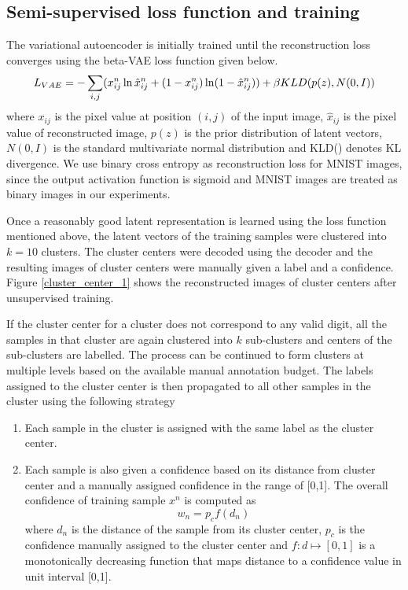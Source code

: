 \documentclass[runningheads]{llncs}
\begin{document}
\subsection{Semi-supervised loss function and training}\label{section_loss_function}
The variational autoencoder is initially trained until the reconstruction loss converges using the beta-VAE loss function \cite{beta_vae} given below.
\vspace{-0.3in}
\begin{equation} \label{vae_loss_eqn}
L_{VAE} = -\sum_{i, j}(x_{ij}^n \ln \hat{x}_{ij}^n
+ (1 - x_{ij}^n) \ln(1 -  \hat{x}_{ij}^n ) )\\
    +\beta KLD(p(z), N(0,I))
\end{equation}
where   $x_{ij}$ is the pixel value at position $(i, j)$ of the input image, $\hat{x}_{ij}$ is the pixel value of reconstructed image, $p(z)$ is the prior distribution of latent vectors, $N(0,I)$ is the standard multivariate normal distribution and KLD() denotes KL divergence.
We use binary cross entropy as reconstruction loss for MNIST images, since the output activation function is sigmoid and MNIST images are treated as binary images in our experiments.

Once a reasonably good latent representation is learned using the loss function mentioned above, the latent vectors of the training samples were clustered into $k=10$ clusters.
The cluster centers were decoded using the decoder  and the resulting images of cluster centers were manually given a label and a confidence.
Figure \ref{cluster_center_1} shows the reconstructed images of cluster centers after unsupervised training.


If the cluster center for a cluster does not correspond to any valid digit, all the samples in that cluster are again clustered into $k$ sub-clusters and  centers of the sub-clusters are labelled.
The process can be continued to form clusters at multiple levels based on the available manual annotation budget.
The labels assigned to the cluster center is then propagated to all other samples in the cluster using the following strategy
\begin{enumerate}
    \item Each sample in the cluster is assigned with the  same label as the cluster center.
    \item Each sample is also given a confidence based on its distance from cluster center and  a manually assigned confidence in the range of [0,1]. The overall confidence of  training sample $x^n$ is computed as $$w_n = p_cf(d_n)$$
where $d_n$ is the distance of the sample from its cluster center, $p_c$  is the confidence manually assigned to the cluster center and $f: d \mapsto [0,1]$ is a monotonically decreasing function that maps distance to a confidence value in unit interval [0,1].
\end{enumerate}
\end{document}

